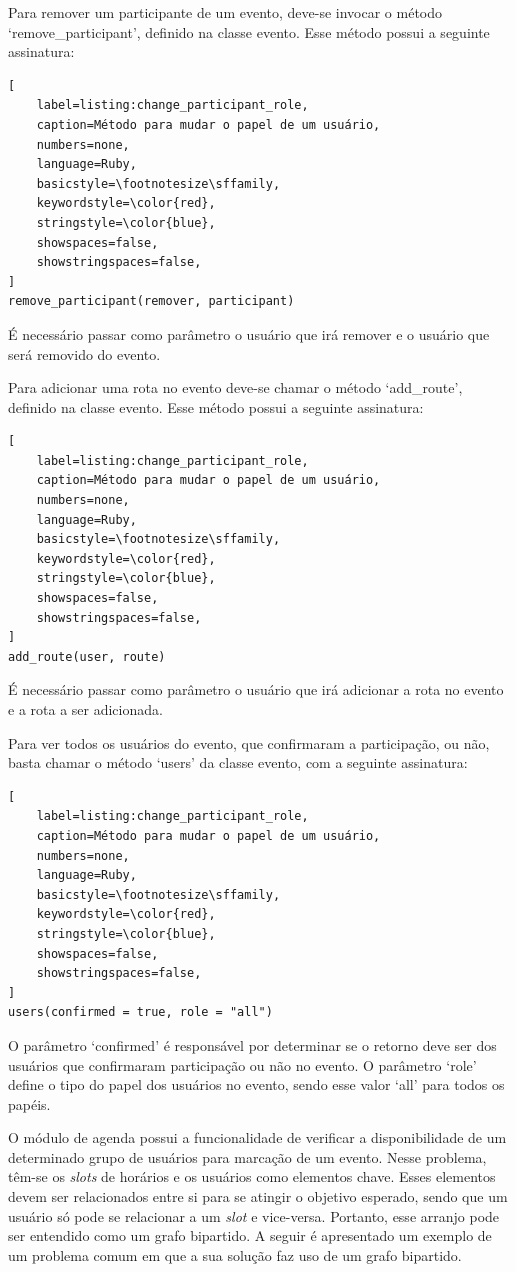 Para remover um participante de um evento, deve-se invocar o método `remove\_participant', definido na classe evento. Esse método possui a seguinte assinatura:

\begin{lstlisting}[
    label=listing:change_participant_role,
    caption=Método para mudar o papel de um usuário,
    numbers=none,
    language=Ruby,
    basicstyle=\footnotesize\sffamily,
    keywordstyle=\color{red},
    stringstyle=\color{blue},
    showspaces=false,
    showstringspaces=false,
]
remove_participant(remover, participant)
\end{lstlisting}

É necessário passar como parâmetro o usuário que irá remover e o usuário que será removido do evento.

Para adicionar uma rota no evento deve-se chamar o método `add\_route', definido na classe evento. Esse método possui a seguinte assinatura:

\begin{lstlisting}[
    label=listing:change_participant_role,
    caption=Método para mudar o papel de um usuário,
    numbers=none,
    language=Ruby,
    basicstyle=\footnotesize\sffamily,
    keywordstyle=\color{red},
    stringstyle=\color{blue},
    showspaces=false,
    showstringspaces=false,
]
add_route(user, route)
\end{lstlisting}

É necessário passar como parâmetro o usuário que irá adicionar a rota no evento e a rota a ser adicionada.

Para ver todos os usuários do evento, que confirmaram a participação, ou não, basta chamar o método `users' da classe evento, com a seguinte assinatura:

\begin{lstlisting}[
    label=listing:change_participant_role,
    caption=Método para mudar o papel de um usuário,
    numbers=none,
    language=Ruby,
    basicstyle=\footnotesize\sffamily,
    keywordstyle=\color{red},
    stringstyle=\color{blue},
    showspaces=false,
    showstringspaces=false,
]
users(confirmed = true, role = "all")
\end{lstlisting}

O parâmetro `confirmed' é responsável por determinar se o retorno deve ser dos usuários que confirmaram participação ou não no evento. O parâmetro `role' define o tipo do papel dos usuários no evento, sendo esse valor `all' para todos os papéis.

O módulo de agenda possui a funcionalidade de verificar a disponibilidade de um determinado grupo de usuários para marcação de um evento. Nesse problema, têm-se os \textit{slots} de horários e os usuários como elementos chave. Esses elementos devem ser relacionados entre si para se atingir o objetivo esperado, sendo que um usuário só pode se relacionar a um \textit{slot} e vice-versa. Portanto, esse arranjo pode ser entendido como um grafo bipartido. A seguir é apresentado um exemplo de um problema comum em que a sua solução faz uso de um grafo bipartido.

